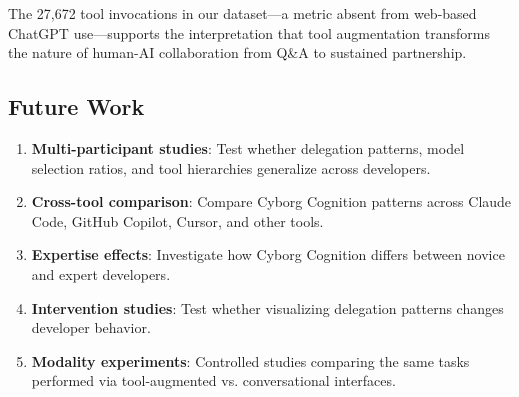 The 27,672 tool invocations in our dataset---a metric absent from web-based ChatGPT use---supports the interpretation that tool augmentation transforms the nature of human-AI collaboration from Q\&A to sustained partnership.

\subsection{Future Work}

\begin{enumerate}
    \item \textbf{Multi-participant studies}: Test whether delegation patterns, model selection ratios, and tool hierarchies generalize across developers.

    \item \textbf{Cross-tool comparison}: Compare Cyborg Cognition patterns across Claude Code, GitHub Copilot, Cursor, and other tools.

    \item \textbf{Expertise effects}: Investigate how Cyborg Cognition differs between novice and expert developers.

    \item \textbf{Intervention studies}: Test whether visualizing delegation patterns changes developer behavior.

    \item \textbf{Modality experiments}: Controlled studies comparing the same tasks performed via tool-augmented vs. conversational interfaces.
\end{enumerate}
